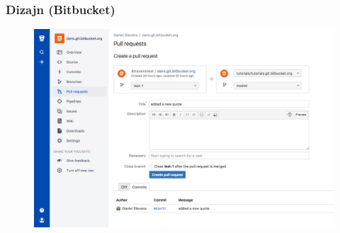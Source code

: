 \documentclass[12p, Times New Roman]{beamer}
\begin{document}
	\begin{frame}
		\frametitle{Dizajn (Bitbucket)} 	%
		\begin{figure}
			\begin{center}
				\includegraphics[scale=0.12]{Shot2.png}
			\end{center}
		\end{figure}

	\end{frame}

	\begin{frame}
		


	\end{frame}                           





	\begin{frame}


	\end{frame}

	\begin{frame}


	\end{frame}

	\begin{frame}


	\end{frame}

	\begin{frame}


	\end{frame}

	\begin{frame}


	\end{frame}

	\begin{frame}


	\end{frame}
\end{document}
